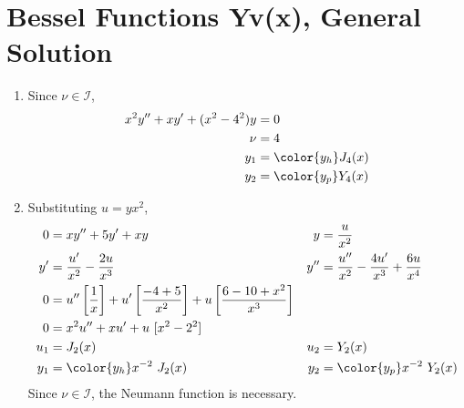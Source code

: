 \section{Bessel Functions Yv(x), General Solution}
\begin{enumerate}
    \item Since $ \nu \in \mathcal{I} $,
          \begin{align}
              x^2y'' + xy' + (x^2 - 4^2)y & = 0                  \\
              \nu                         & = 4                  \\
              y_1                         & = \color{y_h} J_4(x) \\
              y_2                         & = \color{y_p} Y_4(x)
          \end{align}

    \item Substituting $ u = yx^2 $,
          \begin{align}
              0   & = xy'' + 5y' + xy                                            &
              y   & = \frac{u}{x^2}                                                \\
              y'  & = \frac{u'}{x^2} - \frac{2u}{x^3}                            &
              y'' & = \frac{u''}{x^2} - \frac{4u'}{x^3} + \frac{6u}{x^4}           \\
              0   & = u'' \left[ \frac{1}{x} \right] + u'\left[ \frac{-4+5}{x^2}
              \right] + u\left[ \frac{6-10 + x^2}{x^3} \right]                     \\
              0   & = x^2 u'' + xu' + u\ [x^2 - 2^2]                               \\
              u_1 & = J_2(x)                                                     &
              u_2 & = Y_2(x)                                                       \\
              y_1 & = \color{y_h} x^{-2}\ J_2(x)                                 &
              y_2 & = \color{y_p} x^{-2}\ Y_2(x)
          \end{align}
          Since $ \nu \in \mathcal{I} $, the Neumann function is necessary.


\end{enumerate}

